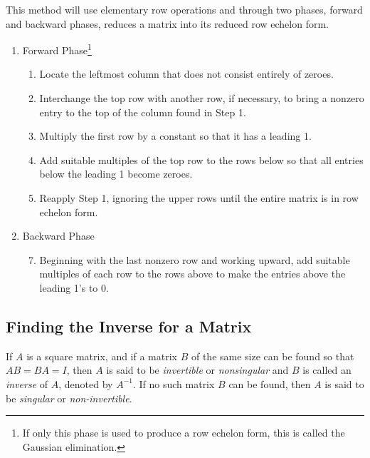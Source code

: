 \documentclass{report}
\begin{document}
		\begin{mthd}\label{mthd_gauss_jordan_elim}
			This method will use elementary row operations and through two phases, forward and backward phases, reduces a matrix into its reduced row echelon form.
			\begin{enumerate}[label=Phase \arabic*.]
				\item Forward Phase\footnote{If only this phase is used to produce a row echelon form, this is called the Gaussian elimination.}
				\begin{enumerate}[label=Step \arabic*.]
					\item Locate the leftmost column that does not consist entirely of zeroes.
					\item Interchange the top row with another row, if necessary, to bring a nonzero entry to the top of the column found in Step 1.
					\item Multiply the first row by a constant so that it has a leading 1.
					\item Add suitable multiples of the top row to the rows below so that all entries below the leading 1 become zeroes.
					\item Reapply Step 1, ignoring the upper rows until the entire matrix is in row echelon form.
				\end{enumerate}
				\item Backward Phase
				\begin{enumerate}[label=Step \arabic*.]
					\setcounter{enumii}{6}
					\item Beginning with the last nonzero row and working upward, add suitable multiples of each row to the rows above to make the entries above the leading 1's to 0.
				\end{enumerate}
			\end{enumerate}
		\end{mthd}
		
		\subsection{Finding the Inverse for a Matrix}
		\begin{defn}[Inverse]
			If $A$ is a square matrix, and if a matrix $B$ of the same size can be found so that $AB=BA=I$, then $A$ is said to be \emph{invertible} or \emph{nonsingular} and $B$ is called an \emph{inverse} of $A$, denoted by $A^{-1}$. If no such matrix $B$ can be found, then $A$ is said to be \emph{singular} or \emph{non-invertible}.
		\end{defn}
		
\end{document}
